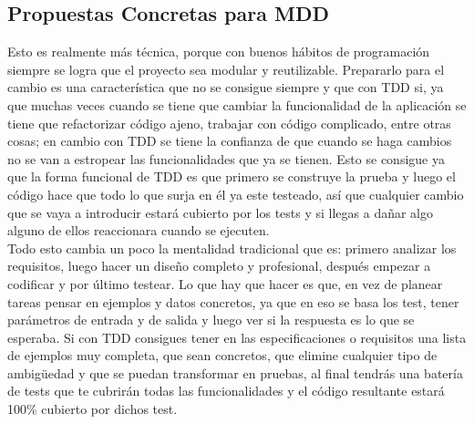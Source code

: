 \subsection{Propuestas Concretas para MDD}
Esto es realmente más técnica, porque con buenos hábitos de programación siempre se logra que el proyecto sea modular y reutilizable. Prepararlo para el cambio es una característica que no se consigue siempre y que con TDD si, ya que muchas veces cuando se tiene que cambiar la funcionalidad de la aplicación se tiene que refactorizar código ajeno, trabajar con código complicado, entre otras cosas; en cambio con TDD se tiene la confianza de que cuando se haga cambios no se van a estropear las funcionalidades que ya se tienen. Esto se consigue ya que la forma funcional de TDD es que primero se construye la prueba y luego el código hace que todo lo que surja en él ya este testeado, así que cualquier cambio que se vaya a introducir estará cubierto por los tests y si llegas a dañar algo alguno de ellos reaccionara cuando se ejecuten.
\textbf{}\\
Todo esto cambia un poco la mentalidad tradicional que es: primero analizar los requisitos, luego hacer un diseño completo y profesional, después empezar a codificar y por último testear. Lo que hay que hacer es que, en vez de planear tareas pensar en ejemplos y datos concretos, ya que en eso se basa los test, tener parámetros de entrada y de salida y luego ver si la respuesta es lo que se esperaba.
Si con TDD consigues tener en las especificaciones o requisitos una lista de ejemplos muy completa, que sean concretos, que elimine cualquier tipo de ambigüedad y que se puedan transformar en pruebas, al final tendrás una batería de tests que te cubrirán todas las funcionalidades y el código resultante estará 100\% cubierto por dichos test.
